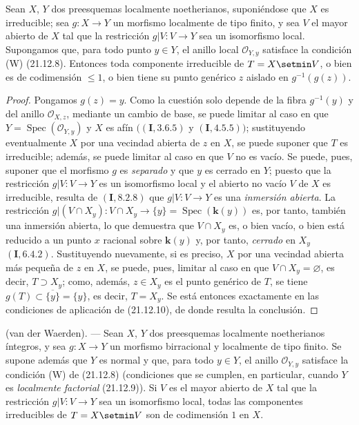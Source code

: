 \begin{corollary}[21.12.11]
\label{IV.21.12.11}
Sean $X$, $Y$ dos preesquemas localmente noetherianos, suponiéndose que $X$ es
irreducible; sea $g:X\to Y$ un morfismo localmente de tipo finito, y sea $V$ el mayor
abierto de $X$ tal que la restricción $g|V:V\to Y$ sea un isomorfismo local.
Supongamos que, para todo punto $y\in Y$, el anillo local $\mathcal O_{Y,y}$ satisface la
condición \textup{(W) (21.12.8)}. Entonces toda componente irreducible de $T=X\setmin V$, \textup{o bien}
es de codimensión $\leq1$, \textup{o bien} tiene su punto genérico $z$ aislado en
$g^{-1}(g(z))$.
\end{corollary}

\begin{proof}
Pongamos $g(z)=y$. Como la cuestión solo depende de la fibra $g^{-1}(y)$ y del anillo
$\mathcal O_{X,z}$, mediante un cambio de base, se puede limitar al caso en que
$Y=\operatorname{Spec}(\mathcal O_{Y,y})$ y $X$ es afín
$((\mathbf I, 3.6.5)$ y $(\mathbf I, 4.5.5))$; sustituyendo eventualmente $X$ por una
vecindad abierta de $z$ en $X$, se puede suponer que $T$ es irreducible; además, se
puede limitar al caso en que $V$ no es vacío. Se puede, pues, suponer que el morfismo $g$ es
\emph{separado} y que $y$ es cerrado en $Y$; puesto que la restricción $g|V:V\to Y$ es un isomorfismo
local y el abierto no vacío $V$ de $X$ es irreducible, resulta de
$(\mathbf I, 8.2.8)$ que $g|V:V\to Y$ es una \emph{inmersión abierta}. La restricción
$g|(V\cap X_y):V\cap X_y\to\{y\}=\operatorname{Spec}(\boldsymbol{k}(y))$ es, por tanto, también una
inmersión abierta, lo que demuestra que $V\cap X_y$ es, o bien vacío, o bien está reducido a un punto
$x$ racional
sobre $\boldsymbol{k}(y)$ y, por tanto, \emph{cerrado} en $X_y$ $(\mathbf I, 6.4.2)$. Sustituyendo nuevamente,
si es preciso, $X$ por una vecindad abierta más pequeña de $z$ en $X$, se puede, pues,
limitar al caso en que $V\cap X_y=\varnothing$, es decir, $T\supset X_y$; como, además,
$z\in X_y$ es el punto genérico de $T$, se tiene
$g(T)\subset\overline{\{y\}}=\{y\}$, es decir, $T=X_y$. Se está entonces exactamente
en las condiciones de aplicación de (21.12.10), de donde resulta la conclusión.
\end{proof}

\begin{theorem}[21.12.12]
\label{IV.21.12.12}
\textup{(van der Waerden)}. ---
Sean $X$, $Y$ dos preesquemas localmente noetherianos íntegros, y sea $g:X\to Y$ un
morfismo birracional y localmente de tipo finito. Se supone además que $Y$ es
normal y que, para todo $y\in Y$, el anillo $\mathcal O_{Y,y}$ satisface la condición \textup{(W)}
de \textup{(21.12.8)} \textup{(condiciones que se cumplen, en particular, cuando $Y$ es \emph{localmente factorial}
(21.12.9))}. Si $V$ es el mayor abierto de $X$ tal que la restricción
$g|V:V\to Y$ sea un isomorfismo local, todas las componentes irreducibles de
$T=X\setmin V$ son de codimensión $1$ en $X$.
\end{theorem}

